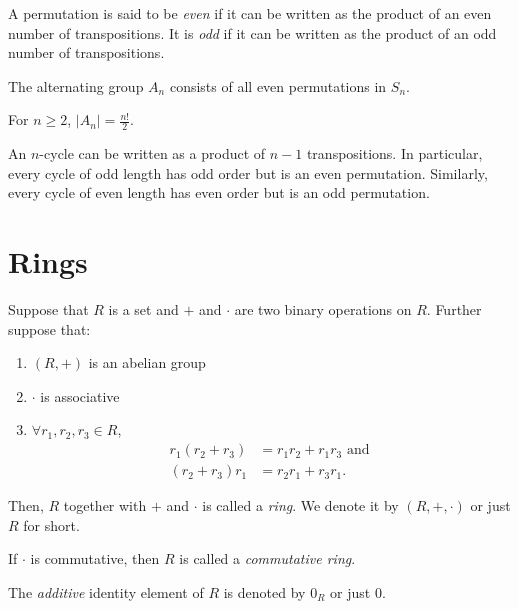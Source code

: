 \begin{definition}
	A permutation is said to be \emph{even} if it can be written as the product
	of an even number of transpositions. It is \emph{odd} if it can be written as
	the product of an odd number of transpositions.
\end{definition}

\begin{definition}
	The alternating group $A_n$ consists of all even permutations in $S_n$.
\end{definition}

\begin{fact}
	For $n \geq 2$, $|A_n| = \frac{n!}{2}$.
\end{fact}

\begin{fact}
	An $n$-cycle can be written as a product of $n - 1$ transpositions. In
	particular, every cycle of odd length has odd order but is an even
	permutation. Similarly, every cycle of even length has even order but is an
	odd permutation.
\end{fact}

\section*{Rings}

\begin{definition}
	Suppose that $R$ is a set and $+$ and $\cdot$ are two binary operations on
	$R$. Further suppose that:
	\begin{enumerate}
		\item $(R, +)$ is an abelian group
		\item $\cdot$ is associative
		\item $\forall r_1, r_2, r_3 \in R$,
			\begin{align*}
				r_1 (r_2 + r_3) &= r_1 r_2 + r_1 r_3 \text{ and } \\
				(r_2 + r_3) r_1 &= r_2 r_1 + r_3 r_1.
			\end{align*}
	\end{enumerate}
	Then, $R$ together with $+$ and $\cdot$ is called a \emph{ring}. We denote it
	by $(R, +, \cdot)$ or just $R$ for short.
\end{definition}

\begin{definition}
	If $\cdot$ is commutative, then $R$ is called a \emph{commutative ring}.
\end{definition}

\begin{notation}
	The \emph{additive} identity element of $R$ is denoted by $0_R$ or just $0$.
\end{notation}

